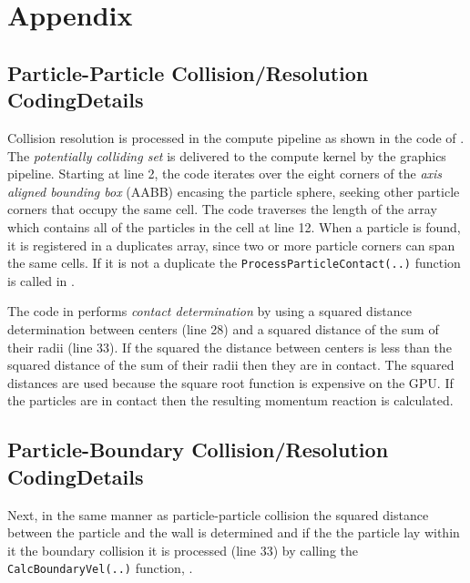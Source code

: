 \newpage
\clearpage
\section{Appendix}


\subsection{Particle-Particle Collision/Resolution CodingDetails}\label{ppcrc}

Collision resolution is processed in the compute pipeline as shown in the code of . The \textit{potentially colliding set} is delivered to the compute kernel by the graphics pipeline. Starting at line 2, the code iterates over the eight corners of the \textit{axis aligned bounding box} (AABB) encasing the particle sphere, seeking other particle corners that occupy the same cell. The code traverses the length of the array which contains all of the particles in the cell at line 12. When a particle is found, it is registered in a duplicates array, since two or more particle corners can span the same cells. If it is not a duplicate the \texttt{ProcessParticleContact(..)} function is called in . 
   


The code in  performs \textit{contact determination} by using a squared distance determination between centers (line 28) and a squared distance of the sum of their radii (line 33). If the squared the distance between centers is less than the squared distance of the sum of their radii then they are in contact. The squared distances are used because the square root function is expensive on the GPU. If the particles are in contact then the resulting momentum reaction is calculated.





\subsection{Particle-Boundary Collision/Resolution CodingDetails}\label{pbcrc}

Next, in the same manner as particle-particle collision the squared distance between the particle and the wall is determined and if the the particle lay within it the boundary collision it is processed (line 33) by calling the \texttt{CalcBoundaryVel(..)} function, . 

